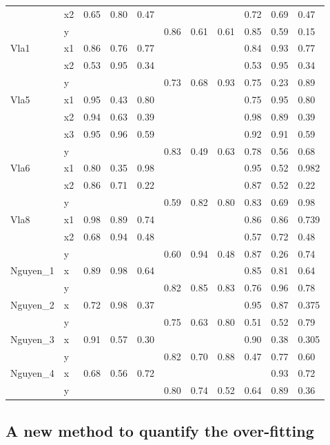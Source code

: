 \begin{table}
\begin{tabular}{lllllllllll}
& x2 & 0.65 & 0.80 & 0.47 & & & & 0.72 & 0.69 & 0.47 \\
& y & & & & 0.86 & 0.61 & 0.61 & 0.85 & 0.59 & 0.15 \\
Vla1 & x1 & 0.86 & 0.76 & 0.77 & & & & 0.84 & 0.93 & 0.77 \\
& x2 & 0.53 & 0.95 & 0.34 & & & & 0.53 & 0.95 & 0.34 \\
& y & & & & 0.73 & 0.68 & 0.93 & 0.75 & 0.23 & 0.89 \\
Vla5 & x1 & 0.95 & 0.43 & 0.80 & & & & 0.75 & 0.95 & 0.80 \\
& x2 & 0.94 & 0.63 & 0.39 & & & & 0.98 & 0.89 & 0.39 \\
& x3 & 0.95 & 0.96 & 0.59 & & & & 0.92 & 0.91 & 0.59 \\
& y & & & & 0.83 & 0.49 & 0.63 & 0.78 & 0.56 & 0.68 \\
Vla6 & x1 & 0.80 & 0.35 & 0.98 & & & & 0.95 & 0.52 & 0.982 \\
& x2 & 0.86 & 0.71 & 0.22 & & & & 0.87 & 0.52 & 0.22 \\
& y & & & & 0.59 & 0.82 & 0.80 & 0.83 & 0.69 & 0.98 \\
Vla8 & x1 & 0.98 & 0.89 & 0.74 & & & & 0.86 & 0.86 & 0.739 \\
& x2 & 0.68 & 0.94 & 0.48 &  & & & 0.57 & 0.72 & 0.48 \\
& y & & & & 0.60 & 0.94 & 0.48 & 0.87 & 0.26 & 0.74 \\
Nguyen\_1 & x & 0.89 & 0.98 & 0.64 & & & & 0.85 & 0.81 & 0.64 \\
& y & & &  & 0.82 & 0.85 & 0.83 & 0.76 & 0.96 & 0.78 \\
Nguyen\_2 & x & 0.72 & 0.98 & 0.37 & & & & 0.95 & 0.87 & 0.375 \\
& y & & & & 0.75 & 0.63 & 0.80 & 0.51 & 0.52 & 0.79 \\
Nguyen\_3 & x & 0.91 & 0.57 & 0.30 & & & & 0.90 & 0.38 & 0.305 \\
& y & &  & & 0.82 & 0.70 & 0.88 & 0.47 & 0.77 & 0.60 \\
Nguyen\_4 & x & 0.68 & 0.56 & 0.72 & & & & & 0.93 & 0.72 \\
& y & & & & 0.80 & 0.74 & 0.52 & 0.64 & 0.89 & 0.36 \\
\hline
\end{tabular}
\end{table}


\subsection{A new method to quantify the over-fitting}
\label{Ane}
